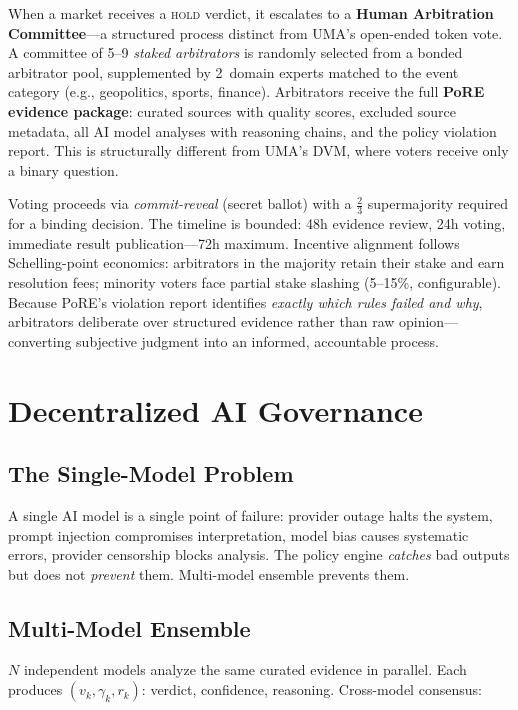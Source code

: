\documentclass[11pt,a4paper,twocolumn]{article}
\begin{document}
When a market receives a \textsc{hold} verdict, it escalates to a \textbf{Human Arbitration Committee}---a structured process distinct from UMA's open-ended token vote. A committee of 5--9 \emph{staked arbitrators} is randomly selected from a bonded arbitrator pool, supplemented by 2~domain experts matched to the event category (e.g., geopolitics, sports, finance). Arbitrators receive the full \textbf{PoRE evidence package}: curated sources with quality scores, excluded source metadata, all AI model analyses with reasoning chains, and the policy violation report. This is structurally different from UMA's DVM, where voters receive only a binary question.

Voting proceeds via \emph{commit-reveal} (secret ballot) with a $\frac{2}{3}$ supermajority required for a binding decision. The timeline is bounded: 48h evidence review, 24h voting, immediate result publication---72h maximum. Incentive alignment follows Schelling-point economics: arbitrators in the majority retain their stake and earn resolution fees; minority voters face partial stake slashing (5--15\%, configurable). Because PoRE's violation report identifies \emph{exactly which rules failed and why}, arbitrators deliberate over structured evidence rather than raw opinion---converting subjective judgment into an informed, accountable process.

\section{Decentralized AI Governance}

\subsection{The Single-Model Problem}

A single AI model is a single point of failure: provider outage halts the system, prompt injection compromises interpretation, model bias causes systematic errors, provider censorship blocks analysis. The policy engine \emph{catches} bad outputs but does not \emph{prevent} them. Multi-model ensemble prevents them.

\subsection{Multi-Model Ensemble}

$N$ independent models analyze the same curated evidence in parallel. Each produces $(v_k, \gamma_k, r_k)$: verdict, confidence, reasoning. Cross-model consensus:
\end{document}

